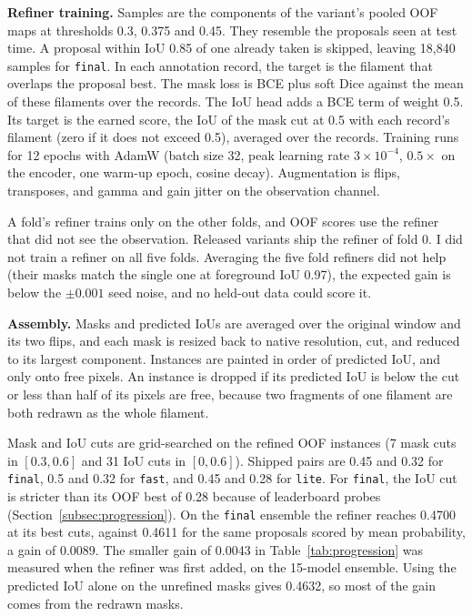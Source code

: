 \documentclass[sigconf,pbalance]{acmart}
\begin{document}
    \textbf{Refiner training.}
    Samples are the components of the variant's pooled OOF maps at thresholds 0.3, 0.375 and 0.45.
    They resemble the proposals seen at test time.
    A proposal within IoU 0.85 of one already taken is skipped, leaving 18{,}840 samples for \texttt{final}.
    In each annotation record, the target is the filament that overlaps the proposal best.
    The mask loss is BCE plus soft Dice against the mean of these filaments over the records.
    The IoU head adds a BCE term of weight 0.5.
    Its target is the earned score, the IoU of the mask cut at 0.5 with each record's filament (zero if it does not exceed 0.5), averaged over the records.
    Training runs for 12 epochs with AdamW (batch size 32, peak learning rate $3\times10^{-4}$, $0.5\times$ on the encoder, one warm-up epoch, cosine decay).
    Augmentation is flips, transposes, and gamma and gain jitter on the observation channel.

    A fold's refiner trains only on the other folds, and OOF scores use the refiner that did not see the observation.
    Released variants ship the refiner of fold 0.
    I did not train a refiner on all five folds.
    Averaging the five fold refiners did not help (their masks match the single one at foreground IoU 0.97), the expected gain is below the $\pm0.001$ seed noise, and no held-out data could score it.

    \textbf{Assembly.}
    Masks and predicted IoUs are averaged over the original window and its two flips, and each mask is resized back to native resolution, cut, and reduced to its largest component.
    Instances are painted in order of predicted IoU, and only onto free pixels.
    An instance is dropped if its predicted IoU is below the cut or less than half of its pixels are free, because two fragments of one filament are both redrawn as the whole filament.

    Mask and IoU cuts are grid-searched on the refined OOF instances (7 mask cuts in $[0.3, 0.6]$ and 31 IoU cuts in $[0, 0.6]$).
    Shipped pairs are 0.45 and 0.32 for \texttt{final}, 0.5 and 0.32 for \texttt{fast}, and 0.45 and 0.28 for \texttt{lite}.
    For \texttt{final}, the IoU cut is stricter than its OOF best of 0.28 because of leaderboard probes (Section~\ref{subsec:progression}).
    On the \texttt{final} ensemble the refiner reaches 0.4700 at its best cuts, against 0.4611 for the same proposals scored by mean probability, a gain of 0.0089.
    The smaller gain of 0.0043 in Table~\ref{tab:progression} was measured when the refiner was first added, on the 15-model ensemble.
    Using the predicted IoU alone on the unrefined masks gives 0.4632, so most of the gain comes from the redrawn masks.
\end{document}
